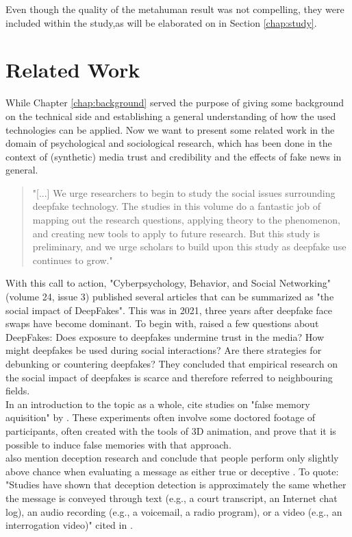 \documentclass[
  a4paper,  %
  twoside,  %
  bibliography=totoc,
  headsepline,
  cleardoublepage=empty,
  parskip=half,
  draft=false
]{scrbook}
\begin{document}
Even though the quality of the metahuman result was not compelling, they were included  within the study,as will be elaborated on in Section \ref{chap:study}. 

\chapter{Related Work}
\label{chap:rel-work}
While Chapter \ref{chap:background} served the purpose of giving some background on the technical side and establishing a general understanding of how the used technologies can be applied. Now we want to present some related work in the domain of psychological and sociological research, which has been done in the context of (synthetic) media trust and credibility and the effects of fake news in general. 

\begin{quotation}
  "[...] We urge researchers to begin to study the social issues surrounding deepfake technology. The studies in this volume do a fantastic job of mapping out the research questions, applying theory to the phenomenon, and creating new tools to apply to future research. But this study is preliminary, and we urge scholars to build upon this study as deepfake use continues to grow." \cite{hancockSocialImpactDeepfakes2021}
\end{quotation}

With this call to action, "Cyberpsychology, Behavior, and Social Networking" (volume 24, issue 3) published several articles that can be summarized as "the social impact of DeepFakes". This was in 2021, three years after deepfake face swaps have become dominant. To begin with, \citet{hancockSocialImpactDeepfakes2021} raised a few questions about DeepFakes: Does exposure to deepfakes undermine trust in the media? How might deepfakes be used during social interactions? Are there strategies for debunking or countering deepfakes? They concluded that empirical research on the social impact of deepfakes is scarce and therefore referred to neighbouring fields. \\
In an introduction to the topic as a whole, \citet{hancockSocialImpactDeepfakes2021} cite studies on "false memory aquisition" by \citet{garryActuallyPictureWorth2005}. These experiments often involve some doctored footage of participants, often created with the tools of 3D animation, and prove that it is possible to induce false memories with that approach. \\
\citet{hancockSocialImpactDeepfakes2021} also mention deception research and conclude that people perform only slightly above chance when evaluating a message as either true or deceptive \cite{bondAccuracyDeceptionJudgments2006}. To quote: "Studies have shown that deception detection is approximately the same whether the message is conveyed through text (e.g., a court transcript, an Internet chat log), an audio recording (e.g., a voicemail, a radio program), or a video (e.g., an interrogation video)" \cite{hancockSeeNoEvil2010} cited in \cite{hancockSocialImpactDeepfakes2021}.
\end{document}
